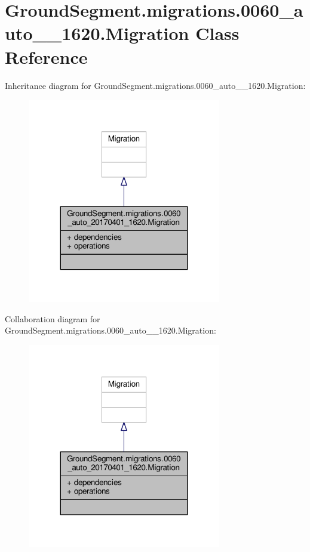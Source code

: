 \hypertarget{class_ground_segment_1_1migrations_1_10060__auto__20170401__1620_1_1_migration}{}\section{Ground\+Segment.\+migrations.0060\+\_\+auto\+\_\+\_\+1620.Migration Class Reference}
\label{class_ground_segment_1_1migrations_1_10060__auto__20170401__1620_1_1_migration}


Inheritance diagram for Ground\+Segment.\+migrations.0060\+\_\+auto\+\_\+\_\+1620.Migration\+:\nopagebreak
\begin{figure}[H]
\begin{center}
\leavevmode
\includegraphics[width=239pt]{class_ground_segment_1_1migrations_1_10060__auto__20170401__1620_1_1_migration__inherit__graph}
\end{center}
\end{figure}


Collaboration diagram for Ground\+Segment.\+migrations.0060\+\_\+auto\+\_\+\_\+1620.Migration\+:\nopagebreak
\begin{figure}[H]
\begin{center}
\leavevmode
\includegraphics[width=239pt]{class_ground_segment_1_1migrations_1_10060__auto__20170401__1620_1_1_migration__coll__graph}
\end{center}
\end{figure}
